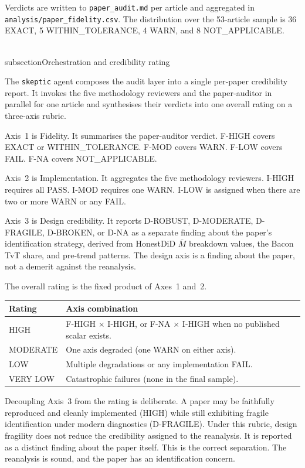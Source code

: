 Verdicts are written to \texttt{paper\_audit.md} per article and aggregated in \texttt{analysis/paper\_fidelity.csv}. The distribution over the 53-article sample is 36 EXACT, 5 WITHIN\_TOLERANCE, 4 WARN, and 8 NOT\_APPLICABLE.


\\subsection{Orchestration and credibility rating}
\label{sec:appc_skeptic}

The \texttt{skeptic} agent composes the audit layer into a single per-paper credibility report. It invokes the five methodology reviewers and the paper-auditor in parallel for one article and synthesises their verdicts into one overall rating on a three-axis rubric.

Axis~1 is Fidelity. It summarises the paper-auditor verdict. F-HIGH covers EXACT or WITHIN\_TOLERANCE. F-MOD covers WARN. F-LOW covers FAIL. F-NA covers NOT\_APPLICABLE.

Axis~2 is Implementation. It aggregates the five methodology reviewers. I-HIGH requires all PASS. I-MOD requires one WARN. I-LOW is assigned when there are two or more WARN or any FAIL.

Axis~3 is Design credibility. It reports D-ROBUST, D-MODERATE, D-FRAGILE, D-BROKEN, or D-NA as a separate finding about the paper's identification strategy, derived from HonestDiD $\bar M$ breakdown values, the Bacon TvT share, and pre-trend patterns. The design axis is a finding about the paper, not a demerit against the reanalysis.

The overall rating is the fixed product of Axes~1 and~2.

\begin{table}[H]
\centering
\footnotesize
\begin{tabularx}{\textwidth}{@{}l X@{}}
\toprule
\textbf{Rating} & \textbf{Axis combination} \\
\midrule
HIGH     & F-HIGH $\times$ I-HIGH, or F-NA $\times$ I-HIGH when no published scalar exists. \\
MODERATE & One axis degraded (one WARN on either axis). \\
LOW      & Multiple degradations or any implementation FAIL. \\
VERY LOW & Catastrophic failures (none in the final sample). \\
\bottomrule
\end{tabularx}
\end{table}

Decoupling Axis~3 from the rating is deliberate. A paper may be faithfully reproduced and cleanly implemented (HIGH) while still exhibiting fragile identification under modern diagnostics (D-FRAGILE). Under this rubric, design fragility does not reduce the credibility assigned to the reanalysis. It is reported as a distinct finding about the paper itself. This is the correct separation. The reanalysis is sound, and the paper has an identification concern.


